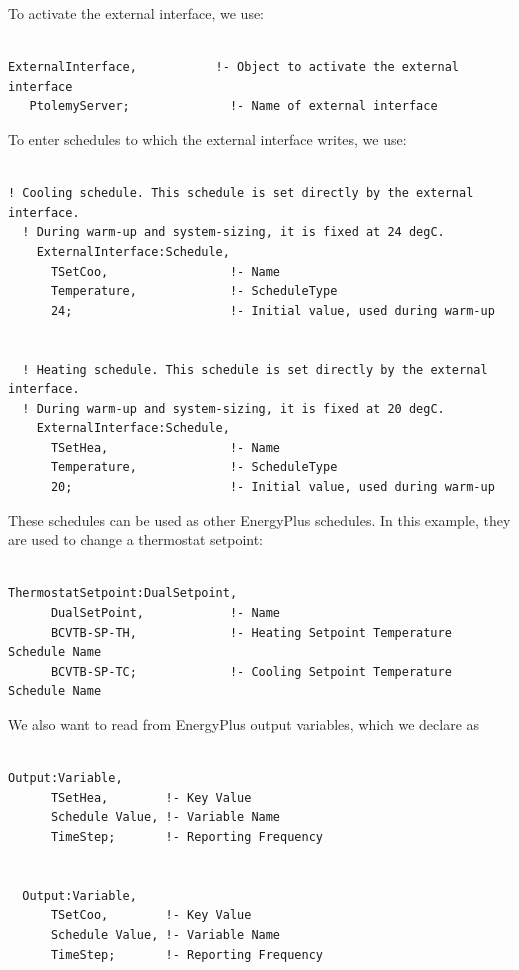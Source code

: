 To activate the external interface, we use:

\begin{lstlisting}

ExternalInterface,           !- Object to activate the external interface
   PtolemyServer;              !- Name of external interface
\end{lstlisting}

To enter schedules to which the external interface writes, we use:

\begin{lstlisting}

! Cooling schedule. This schedule is set directly by the external interface.
  ! During warm-up and system-sizing, it is fixed at 24 degC.
    ExternalInterface:Schedule,
      TSetCoo,                 !- Name
      Temperature,             !- ScheduleType
      24;                      !- Initial value, used during warm-up


  ! Heating schedule. This schedule is set directly by the external interface.
  ! During warm-up and system-sizing, it is fixed at 20 degC.
    ExternalInterface:Schedule,
      TSetHea,                 !- Name
      Temperature,             !- ScheduleType
      20;                      !- Initial value, used during warm-up
\end{lstlisting}

These schedules can be used as other EnergyPlus schedules. In this example, they are used to change a thermostat setpoint:

\begin{lstlisting}

ThermostatSetpoint:DualSetpoint,
      DualSetPoint,            !- Name
      BCVTB-SP-TH,             !- Heating Setpoint Temperature Schedule Name
      BCVTB-SP-TC;             !- Cooling Setpoint Temperature Schedule Name
\end{lstlisting}

We also want to read from EnergyPlus output variables, which we declare as

\begin{lstlisting}

Output:Variable,
      TSetHea,        !- Key Value
      Schedule Value, !- Variable Name
      TimeStep;       !- Reporting Frequency


  Output:Variable,
      TSetCoo,        !- Key Value
      Schedule Value, !- Variable Name
      TimeStep;       !- Reporting Frequency
\end{lstlisting}

